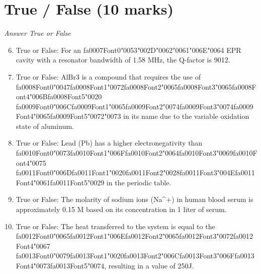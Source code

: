 \documentclass[12pt]{article}
\begin{document}
\section*{True / False (10 marks)}
\textit{Answer True or False}
\begin{enumerate}[label=\arabic*.]
\setcounter{enumi}{5}
\item True or False: For an {\csname fa0007Font0\endcsname\char"0053}{\char"002D}{\char"0062}{\char"0061}{\char"006E}{\char"0064} EPR cavity with a resonator bandwidth of 1.58 MHz, the Q-factor is 9012.
\item True or False: AlBr3 is a compound that requires the use of {\csname fa0008Font0\endcsname\char"0047}{\csname fa0008Font1\endcsname\char"0072}{\csname fa0008Font2\endcsname\char"0065}{\csname fa0008Font3\endcsname\char"0065}{\csname fa0008Font4\endcsname\char"006B}{\csname fa0008Font5\endcsname\char"0020} {\csname fa0009Font0\endcsname\char"006C}{\csname fa0009Font1\endcsname\char"0065}{\csname fa0009Font2\endcsname\char"0074}{\csname fa0009Font3\endcsname\char"0074}{\csname fa0009Font4\endcsname\char"0065}{\csname fa0009Font5\endcsname\char"0072}{\char"0073} in its name due to the variable oxidation state of aluminum.
\item True or False: Lead (Pb) has a higher electronegativity than {\csname fa0010Font0\endcsname\char"0073}{\csname fa0010Font1\endcsname\char"006F}{\csname fa0010Font2\endcsname\char"0064}{\csname fa0010Font3\endcsname\char"0069}{\csname fa0010Font4\endcsname\char"0075} {\csname fa0011Font0\endcsname\char"006D}{\csname fa0011Font1\endcsname\char"0020}{\csname fa0011Font2\endcsname\char"0028}{\csname fa0011Font3\endcsname\char"004E}{\csname fa0011Font4\endcsname\char"0061}{\csname fa0011Font5\endcsname\char"0029} in the periodic table.
\item True or False: The molarity of sodium ions (Na\^{}+) in human blood serum is approximately 0.15 M based on its concentration in 1 liter of serum.
\item True or False: The heat transferred to the system is equal to the {\csname fa0012Font0\endcsname\char"0065}{\csname fa0012Font1\endcsname\char"006E}{\csname fa0012Font2\endcsname\char"0065}{\csname fa0012Font3\endcsname\char"0072}{\csname fa0012Font4\endcsname\char"0067} {\csname fa0013Font0\endcsname\char"0079}{\csname fa0013Font1\endcsname\char"0020}{\csname fa0013Font2\endcsname\char"006C}{\csname fa0013Font3\endcsname\char"006F}{\csname fa0013Font4\endcsname\char"0073}{\csname fa0013Font5\endcsname\char"0074}, resulting in a value of 250J.
\end{enumerate}
\end{document}
